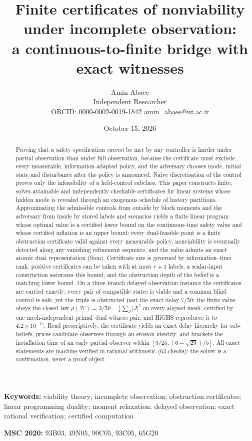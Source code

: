 \documentclass[11pt,a4paper]{article}
\theoremstyle{plain}
\theoremstyle{definition}
\theoremstyle{remark}
\newcommand{\calH}{\mathcal{H}}
\begin{document}
\title{\textbf{Finite certificates of nonviability under incomplete observation:\\ a continuous-to-finite bridge with exact witnesses}}
\author{Amin Abaee\\[0.3em]
{\small Independent Researcher}\\[0.2em]
{\small ORCID: \href{https://orcid.org/0000-0002-0019-1842}{0000-0002-0019-1842}\quad
\href{mailto:amin_abaee@ut.ac.ir}{amin\_abaee@ut.ac.ir}}}
\date{October 15, 2026}
\maketitle

\begin{abstract}
\noindent
Proving that a safety specification \emph{cannot} be met by any controller is harder under partial observation than under full observation, because the certificate must exclude every measurable, information-adapted policy, and the adversary chooses mode, initial state and disturbance after the policy is announced. Naive discretisation of the control proves only the infeasibility of a held-control subclass. This paper constructs finite, solver-attainable and independently checkable certificates for linear systems whose hidden mode is revealed through an exogenous schedule of history partitions. Approximating the admissible controls from outside by block moments and the adversary from inside by stored labels and scenarios yields a finite linear program whose optimal value is a certified lower bound on the continuous-time safety value and whose certified inflation is an upper bound; every dual-feasible point is a finite obstruction certificate valid against every measurable policy, nonviability is eventually detected along any vanishing refinement sequence, and the value admits an exact atomic dual representation (Sion). Certificate size is governed by information--time rank: positive certificates can be taken with at most $r+1$ labels, a scalar-input construction saturates this bound, and the obstruction depth of the belief is a matching lower bound. On a three-branch delayed-observation instance the certificates are carried exactly: every pair of compatible states is viable and a common blind control is safe, yet the triple is obstructed past the exact delay $7/50$; the finite value obeys the closed law $\rho(\calH)=3/50-\frac14\sum_J|J|^2$ on every aligned mesh, certified by one mesh-independent primal--dual witness pair, and HiGHS reproduces it to $4.2\times10^{-17}$. Read prescriptively, the certificate yields an exact delay hierarchy for sub-beliefs, prices candidate observers through an erosion identity, and brackets the installation time of an early partial observer within $[3/25,(6-\sqrt{29})/5]$. All exact statements are machine-verified in rational arithmetic (63 checks); the solver is a confirmation, never a proof object.
\end{abstract}

\medskip
\noindent\textbf{Keywords:} viability theory; incomplete observation; obstruction certificates; linear programming duality; moment relaxation; delayed observation; exact rational verification; certified computation

\medskip
\noindent\textbf{MSC 2020:} 93B03, 49N05, 90C05, 93C05, 65G20
\end{document}
